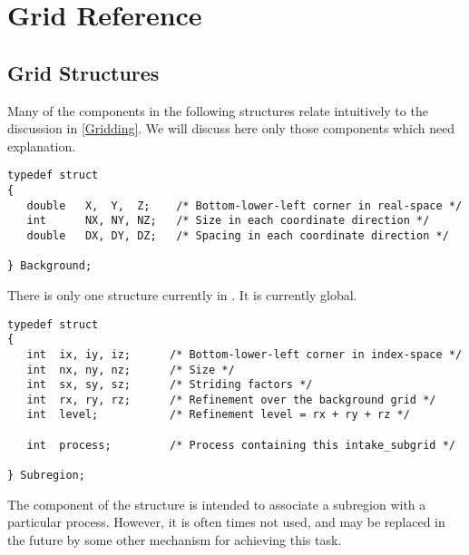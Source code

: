 
\newpage
\section{Grid Reference}
\label{Grid Reference}


\subsection{Grid Structures}
\label{Grid Structures}

Many of the components in the following structures relate intuitively
to the discussion in \ref{Gridding}.
We will discuss here only those components which need explanation.

\begin{display}\begin{verbatim}
typedef struct
{
   double   X,  Y,  Z;    /* Bottom-lower-left corner in real-space */
   int      NX, NY, NZ;   /* Size in each coordinate direction */
   double   DX, DY, DZ;   /* Spacing in each coordinate direction */

} Background;
\end{verbatim}\end{display}

There is only one  structure currently in \parflow{}.
It is currently global.

\begin{display}\begin{verbatim}
typedef struct
{
   int  ix, iy, iz;      /* Bottom-lower-left corner in index-space */
   int  nx, ny, nz;      /* Size */
   int  sx, sy, sz;      /* Striding factors */
   int  rx, ry, rz;      /* Refinement over the background grid */
   int  level;           /* Refinement level = rx + ry + rz */

   int  process;         /* Process containing this intake_subgrid */

} Subregion;
\end{verbatim}\end{display}

The  component of the  structure is
intended to associate a subregion with a particular process.
However, it is often times not used, and may be replaced in the
future by some other mechanism for achieving this task.

